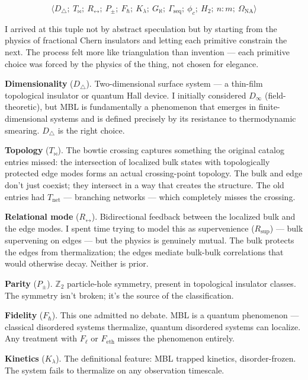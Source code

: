 \documentclass[12pt,a4paper]{article}
\begin{document}
\[\langle D_{\triangle};\ T_{\bowtie};\ R_{\leftrightarrow};\ P_{\pm};\ F_{\hbar};\ K_{\lambda};\ G_{\aleph};\ \Gamma_\text{seq};\ \phi_c;\ H_2;\ n{:}m;\ \Omega_\text{NA} \rangle\]

I arrived at this tuple not by abstract speculation but by starting from the physics of fractional Chern insulators and letting each primitive constrain the next. The process felt more like triangulation than invention --- each primitive choice was forced by the physics of the thing, not chosen for elegance.

\textbf{Dimensionality} ($D_{\triangle}$). Two-dimensional surface system --- a thin-film topological insulator or quantum Hall device. I initially considered $D_{\infty}$ (field-theoretic), but MBL is fundamentally a phenomenon that emerges in finite-dimensional systems and is defined precisely by its resistance to thermodynamic smearing. $D_{\triangle}$ is the right choice.

\textbf{Topology} ($T_{\bowtie}$). The bowtie crossing captures something the original catalog entries missed: the intersection of localized bulk states with topologically protected edge modes forms an actual crossing-point topology. The bulk and edge don't just coexist; they intersect in a way that creates the structure. The old entries had $T_{\text{net}}$ --- branching networks --- which completely misses the crossing.

\textbf{Relational mode} ($R_{\leftrightarrow}$). Bidirectional feedback between the localized bulk and the edge modes. I spent time trying to model this as supervenience ($R_{\text{sup}}$) --- bulk supervening on edges --- but the physics is genuinely mutual. The bulk protects the edges from thermalization; the edges mediate bulk-bulk correlations that would otherwise decay. Neither is prior.

\textbf{Parity} ($P_{\pm}$). $\mathbb{Z}_2$ particle-hole symmetry, present in topological insulator classes. The symmetry isn't broken; it's the source of the classification.

\textbf{Fidelity} ($F_{\hbar}$). This one admitted no debate. MBL is a quantum phenomenon --- classical disordered systems thermalize, quantum disordered systems can localize. Any treatment with $F_{\ell}$ or $F_{\text{eth}}$ misses the phenomenon entirely.

\textbf{Kinetics} ($K_{\lambda}$). The definitional feature: MBL trapped kinetics, disorder-frozen. The system fails to thermalize on any observation timescale.
\end{document}
